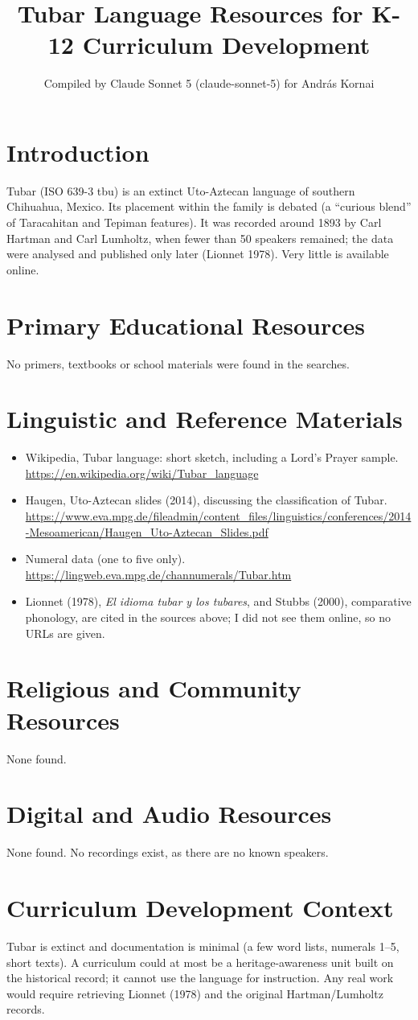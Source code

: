 \documentclass[12pt]{article}
\title{Tubar Language Resources for K-12 Curriculum Development}
\author{Compiled by Claude Sonnet 5 (claude-sonnet-5) for Andr\'as Kornai}
\date{}
\begin{document}
\maketitle
\section{Introduction}
Tubar (ISO 639-3 tbu) is an extinct Uto-Aztecan language of southern Chihuahua, Mexico. Its placement within the family is debated (a ``curious blend'' of Taracahitan and Tepiman features). It was recorded around 1893 by Carl Hartman and Carl Lumholtz, when fewer than 50 speakers remained; the data were analysed and published only later (Lionnet 1978). Very little is available online.
\section{Primary Educational Resources}
No primers, textbooks or school materials were found in the searches.
\section{Linguistic and Reference Materials}
\begin{itemize}
\item Wikipedia, Tubar language: short sketch, including a Lord's Prayer sample. \url{https://en.wikipedia.org/wiki/Tubar_language}
\item Haugen, Uto-Aztecan slides (2014), discussing the classification of Tubar. \url{https://www.eva.mpg.de/fileadmin/content_files/linguistics/conferences/2014-Mesoamerican/Haugen_Uto-Aztecan_Slides.pdf}
\item Numeral data (one to five only). \url{https://lingweb.eva.mpg.de/channumerals/Tubar.htm}
\item Lionnet (1978), \emph{El idioma tubar y los tubares}, and Stubbs (2000), comparative phonology, are cited in the sources above; I did not see them online, so no URLs are given.
\end{itemize}
\section{Religious and Community Resources}
None found.
\section{Digital and Audio Resources}
None found. No recordings exist, as there are no known speakers.
\section{Curriculum Development Context}
Tubar is extinct and documentation is minimal (a few word lists, numerals 1--5, short texts). A curriculum could at most be a heritage-awareness unit built on the historical record; it cannot use the language for instruction. Any real work would require retrieving Lionnet (1978) and the original Hartman/Lumholtz records.
\end{document}
